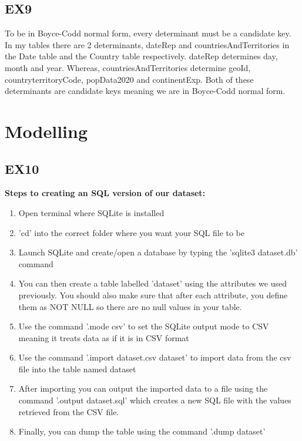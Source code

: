 \documentclass[]{article}
\begin{document}
\subsection{EX9}

To be in Boyce-Codd normal form, every determinant must be a candidate key. In my tables there are 2 determinants,
dateRep and countriesAndTerritories in the Date table and the Country table respectively. dateRep determines day, month and year.
Whereas, countriesAndTerritories determine geoId, countryterritoryCode, popData2020 and continentExp. Both of these determinants
are candidate keys meaning we are in Boyce-Codd normal form.

\section{Modelling}

\subsection{EX10}

\textbf{Steps to creating an SQL version of our dataset:}
\begin{enumerate}
    \item Open terminal where SQLite is installed
    \item 'cd' into the correct folder where you want your SQL file to be
    \item Launch SQLite and create/open a database by typing the 'sqlite3 dataset.db' command
    \item You can then create a table labelled 'dataset' using the attributes we used previously. You should also make sure that after each attribute, you define them as NOT NULL so there are no null values in your table.
    \item Use the command '.mode csv' to set the SQLite output mode to CSV meaning it treats data as if it is in CSV format
    \item Use the command '.import dataset.csv dataset' to import data from the csv file into the table named dataset
    \item After importing you can output the imported data to a file using the command '.output dataset.sql' which creates a new SQL file with the values retrieved from the CSV file.
    \item Finally, you can dump the table using the command '.dump dataset'
\end{enumerate}
\end{document}
